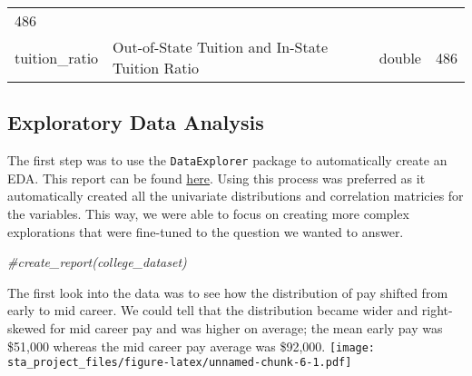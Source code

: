 \documentclass[
]{article}
\newenvironment{Shaded}{\begin{snugshade}}{\end{snugshade}}
\newcommand{\CommentTok}[1]{\textcolor[rgb]{0.56,0.35,0.01}{\textit{#1}}}
\begin{document}
\begin{longtable}[]{@{}llll@{}}
\begin{minipage}[t]{0.23\columnwidth}
486\strut
\end{minipage}\tabularnewline
\begin{minipage}[t]{0.19\columnwidth}\raggedright
tuition\_ratio\strut
\end{minipage} & \begin{minipage}[t]{0.28\columnwidth}\raggedright
Out-of-State Tuition and In-State Tuition Ratio\strut
\end{minipage} & \begin{minipage}[t]{0.18\columnwidth}\raggedright
double\strut
\end{minipage} & \begin{minipage}[t]{0.23\columnwidth}\raggedright
486\strut
\end{minipage}\tabularnewline
\bottomrule
\end{longtable}

\hypertarget{exploratory-data-analysis}{%
\subsection{Exploratory Data Analysis}\label{exploratory-data-analysis}}

The first step was to use the \texttt{DataExplorer} package to
automatically create an EDA. This report can be found
\href{https://github.com/luizmalpele/stats_learning_project/blob/master/project/EDA_report.html}{here}.
Using this process was preferred as it automatically created all the
univariate distributions and correlation matricies for the variables.
This way, we were able to focus on creating more complex explorations
that were fine-tuned to the question we wanted to answer.

\begin{Shaded}
\begin{Highlighting}[]
\CommentTok{#create_report(college_dataset)}
\end{Highlighting}
\end{Shaded}

The first look into the data was to see how the distribution of pay
shifted from early to mid career. We could tell that the distribution
became wider and right-skewed for mid career pay and was higher on
average; the mean early pay was \$51,000 whereas the mid career pay
average was \$92,000.
\texttt{[image: sta\_project\_files/figure-latex/unnamed-chunk-6-1.pdf]}
\end{document}
